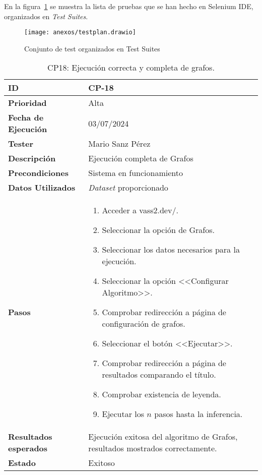 En la figura~\ref{fig:anexos/testplan.drawio} se muestra la lista de pruebas que se han hecho en Selenium IDE, organizados en \textit{Test Suites}.

\begin{figure}[H]
	\centering
	\texttt{[image: anexos/testplan.drawio]}
	\caption[Test Plan de la Web]{Conjunto de test organizados en Test Suites}\label{fig:anexos/testplan.drawio}
\end{figure}


\begin{table}[ht]
	\centering
	\renewcommand{\arraystretch}{1.5} %
	\begin{tabular}{>{\raggedright\arraybackslash}p{4cm} p{9.5cm}}
    \hline
    \rowcolor{gray!20}
    \textbf{ID} & CP-18\\
    \hline
    \rowcolor{white}
    \textbf{Prioridad} & Alta \\
    \hline
    \rowcolor{gray!20}
    \textbf{Fecha de Ejecución} & 03/07/2024 \\
    \hline
    \rowcolor{white}
    \textbf{Tester} & Mario Sanz Pérez \\
    \hline
    \rowcolor{gray!20}
    \textbf{Descripción} & Ejecución completa de Grafos\\
    \hline
    \rowcolor{white}
    \textbf{Precondiciones} & Sistema en funcionamiento\\
    \hline
    \rowcolor{white}
    \textbf{Datos Utilizados} & \textit{Dataset} proporcionado\\
    \hline
    \rowcolor{gray!20}
    \textbf{Pasos} & \begin{enumerate}
        \item Acceder a vass2.dev/.
        \item Seleccionar la opción de Grafos.
        \item Seleccionar los datos necesarios para la ejecución.
        \item Seleccionar la opción <<Configurar Algoritmo>>.
        \item Comprobar redirección a página de configuración de grafos.
        \item Seleccionar el botón <<Ejecutar>>.
        \item Comprobar redirección a página de resultados comparando el título.
        \item Comprobar existencia de leyenda.
        \item Ejecutar los $n$ pasos hasta la inferencia.
    \end{enumerate}\\
	\hline
    \rowcolor{gray!20}
    \textbf{Resultados esperados} & Ejecución exitosa del algoritmo de Grafos, resultados mostrados correctamente.\\
    \hline
    \rowcolor{white}
    \textbf{Estado} & Exitoso\\
    \hline
\end{tabular}
	\caption[CP18: Ejecución Grafos]{CP18: Ejecución correcta y completa de grafos.}
\end{table}

